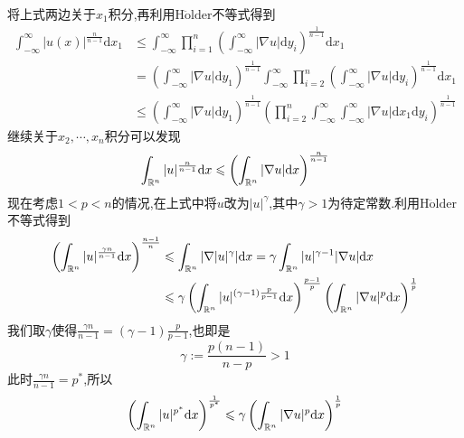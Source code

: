 将上式两边关于$x_1$积分,再利用$\mathrm{H\ddot{o}lder }$不等式得到
$$
\begin{aligned}
    \int_{-\infty}^{\infty}|u(x)|^{\frac{n}{n-1}}\mathrm{d}x_1 &\leqslant \int_{-\infty}^{\infty}\prod _{i=1}^n\left(\int_{-\infty}^{\infty}|\nabla u|\mathrm{d}y_i\right)^{\frac{1}{n-1}}\mathrm{d}x_1\\
                                                               &= \left(\int_{-\infty}^{\infty}|\nabla u|\mathrm{d}y_1\right)^{\frac{1}{n-1}}\int_{-\infty}^{\infty}\prod _{i=2}^n\left(\int_{-\infty}^{\infty}|\nabla u|\mathrm{d}y_i\right)^{\frac{1}{n-1}}\mathrm{d}x_1\\
                                                               &\leqslant\left(\int_{-\infty}^{\infty}|\nabla u|\mathrm{d}y_1\right)^{\frac{1}{n-1}}\left(\prod _{i=2}^n\int_{-\infty}^{\infty}\int_{-\infty}^{\infty}|\nabla u|\mathrm{d}x_1\mathrm{d}y_i\right)^{\frac{1}{n-1}}
\end{aligned}
$$
继续关于$x_2,\cdots,x_n$积分可以发现
$$
\int_{\mathbb{R}^n}|u|^{\frac{n}{n-1}}\mathrm{d}x\leqslant\left(\int_{\mathbb{R}^n}|\nabla u|\mathrm{d}x\right)^{\frac{n}{n-1}}
$$
\qquad 现在考虑$1<p<n$的情况,在上式中将$u$改为$|u|^{\gamma}$,其中$\gamma>1$为待定常数.利用$\mathrm{H\ddot{o}lder }$不等式得到
$$
\begin{aligned}
    \left(\int_{\mathbb{R}^n}|u|^{\frac{\gamma n}{n-1}}\mathrm{d}x\right)^{\frac{n-1}{n}} &\leqslant \int_{\mathbb{R}^n}|\nabla |u|^\gamma|\mathrm{d}x=\gamma\int_{\mathbb{R}^n}|u|^{\gamma-1}|\nabla u|\mathrm{d}x\\
                                                                                  &\leqslant \gamma \left(\int_{\mathbb{R}^n}|u|^{(\gamma-1)\frac{p}{p-1}}\mathrm{d}x\right)^{\frac{p-1}{p}}\left(\int_{\mathbb{R}^n}|\nabla u|^p\mathrm{d}x\right)^{\frac{1}{p}}
\end{aligned}
$$
我们取$\gamma$使得$\frac{\gamma n}{n-1}=(\gamma-1)\frac{p}{p-1}$,也即是
$$
\gamma:=\frac{p(n-1)}{n-p}>1
$$
此时$\frac{\gamma n}{n-1}=p^*$,所以
$$
\left(\int_{\mathbb{R}^n}|u|^{p^*}\mathrm{d}x\right)^{\frac{1}{p^*}}\leqslant \gamma \left(\int_{\mathbb{R}^n}|\nabla u|^p\mathrm{d}x\right)^{\frac{1}{p}}
$$

